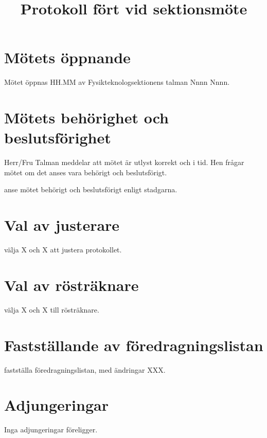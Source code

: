 \documentclass{sektionsmote}
\title{Protokoll fört vid sektionsmöte}
\begin{document}
\maketitle

\section{Mötets öppnande}
Mötet öppnas HH.MM av Fysikteknologsektionens talman Nnnn Nnnn.


\section{Mötets behörighet och beslutsförighet}
Herr/Fru Talman meddelar att mötet är utlyst korrekt och i tid. Hen frågar mötet om det anses vara behörigt och beslutsförigt.
    \begin{beslut}
    \item anse mötet behörigt och beslutsförigt enligt stadgarna.
    \end{beslut}


\section{Val av justerare}
    \begin{beslut}
    \item välja X och X att justera protokollet. 
    \end{beslut}


\section{Val av rösträknare}
    \begin{beslut}
    \item välja X och X till rösträknare.
    \end{beslut}


\section{Fastställande av föredragningslistan}
    \begin{beslut}
    \item fastställa föredragningslistan, med ändringar XXX.
    \end{beslut}


\section{Adjungeringar}
Inga adjungeringar föreligger.
\end{document}
